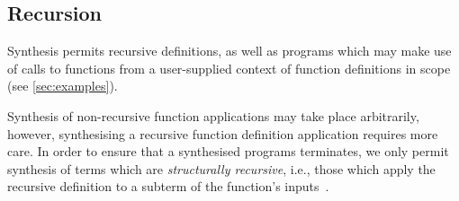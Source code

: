 \subsection{Recursion}
\label{sec:recursion}

Synthesis permits recursive definitions, as well as programs
which may make use of calls to functions from a user-supplied context of
function definitions in scope (see \ref{sec:examples}).

Synthesis of non-recursive function applications may take place arbitrarily,
however, synthesising a recursive function definition application requires more
care. In order to ensure that a synthesised programs terminates, we only permit synthesis of
terms which are \textit{structurally recursive}, i.e., those which apply the recursive
definition to a subterm of the function's inputs~\cite{oserathesis}.

\newcommand*{\synMuR}{ \inferrule*[right=$\mu_\textsc{R}$]
  {\Gamma \vdash [[ A ]] [ \mu X . A / X] \Rightarrow t \mid\ \Delta} {\Gamma \vdash \mu X . A \Rightarrow t \mid\ \Delta}}
\newcommand*{\synMuL}{ \inferrule*[right=$\mu_\textsc{L}$]
  { [[G]], x :_r [[ A]] [\mu X . [[ A ]] / X ] \vdash [[ B ]] \Rightarrow [[ t ]] \mid\ [[ D]]} {[[ G ]], x :_r \mu X . [[ A ]] \vdash [[ B ]] \Rightarrow [[ t]] \mid\ [[D]]}}

\newcommand*{\fsynMuR}{ \inferrule*[right=$\mu_\textsc{R}$]
  {\Gamma ; \emptyset \vdash [[ A ]] [ \mu X . A / X] \Downarrow\ \Rightarrow t \mid\ \Delta} {\Gamma ; \emptyset \vdash \mu X . A \Downarrow\ \Rightarrow t \mid\ \Delta}}
\newcommand*{\fsynMuL}{ \inferrule*[right=$\mu_\textsc{L}$]
  { [[G]] ; [[ O ]], x :_r [[ A]] [\mu X . [[ A ]] / X ] \Uparrow\ \vdash [[ B ]] \Rightarrow [[ t ]] \mid\ [[ D]]} {[[ G ]]; [[O]], x :_r \mu X . [[ A ]] \Uparrow\ \vdash [[ B ]] \Rightarrow [[ t]] \mid\ [[D]]}}

